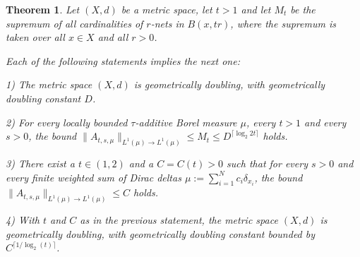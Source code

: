 \documentclass[12pt]{amsart}
\newtheorem{theorem}{Theorem}[section]
\theoremstyle{definition}
\theoremstyle{parrafo}
\begin{document}
		
\begin{theorem}  \label{geomdoubling} Let $(X, d)$ be a  
 	metric  space, let $t > 1$ and let
$M_t$ be the supremum of all cardinalities of
  $r$-nets in $B(x, t r)$, where the supremum is taken
over all  $x \in X$ and all $r >0$. 

Each of the following statements implies the next one:

1) The metric  space  $(X, d)$ is geometrically doubling, with geometrically  doubling constant $D$.

2)  For every locally bounded $\tau$-additive Borel measure $\mu$, every $t > 1$ and every $s > 0$, the bound
$\|A_{t, s, \mu} \|_{L^1(\mu)\to L^1(\mu)} \le M_t \le D^{\lceil \log_2 2t \rceil}$ holds.

3)  There exist a $t \in (1,2) $ and a $C = C(t) > 0$ such that for every $s > 0$ and every finite  weighted sum of Dirac deltas $\mu := \sum_{i = 1}^N c_i \delta_{x_i}$, the bound
$\|A_{t, s, \mu} \|_{L^1(\mu)\to L^1(\mu)} \le C$ holds.
	
4) With $t$ and $C$ as in the previous statement, the metric  space  $(X, d)$ is geometrically doubling, with geometrically doubling constant bounded by $C^{\lceil 1/\log_2(t)\rceil}$.
 \end{theorem} 
\end{document}
